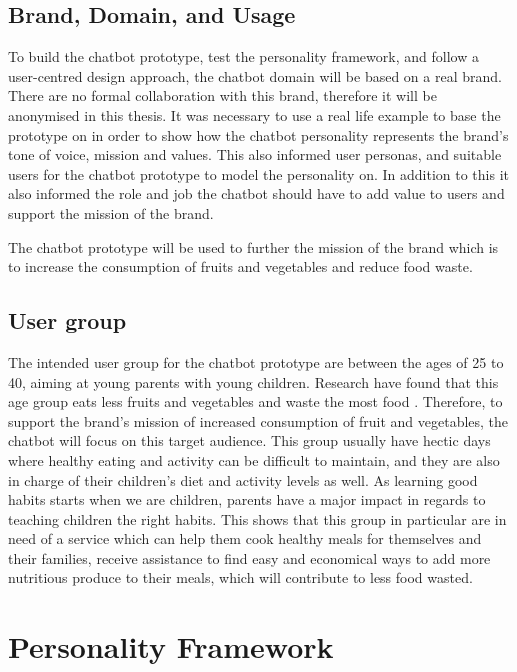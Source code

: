 \vspace{5mm} %

\subsection{Brand, Domain, and Usage}

To build the chatbot prototype, test the personality framework, and follow a user-centred design approach, the chatbot domain will be based on a real brand. There are no formal collaboration with this brand, therefore it will be anonymised in this thesis. It was necessary to use a real life example to base the prototype on in order to show how the chatbot personality represents the brand's tone of voice, mission and values. This also informed user personas, and suitable users for the chatbot prototype to model the personality on. In addition to this it also informed the role and job the chatbot should have to add value to users and support the mission of the brand.

The chatbot prototype will be used to further the mission of the brand which is to increase the consumption of fruits and vegetables and reduce food waste. 

\subsection{User group}

The intended user group for the chatbot prototype are between the ages of 25 to 40, aiming at young parents with young children. Research have found that this age group eats less fruits and vegetables and waste the most food 
. Therefore, to support the brand's mission of increased consumption of fruit and vegetables, the chatbot will focus on this target audience. This group usually have hectic days where healthy eating and activity can be difficult to maintain, and they are also in charge of their children’s diet and activity levels as well. As learning good habits starts when we are children, parents have a major impact in regards to teaching children the right habits. This shows that this group in particular are in need of a service which can help them cook healthy meals for themselves and their families, receive assistance to find easy and economical ways to add more nutritious produce to their meals, which will contribute to less food wasted.

\section{Personality Framework}

